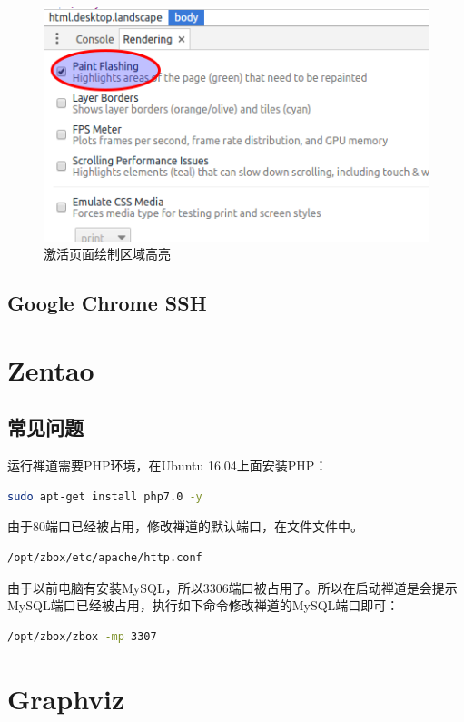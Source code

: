 \documentclass[letter]{book}
\begin{document}
\begin{figure}[htbp]
	\centering
	\includegraphics[scale=0.7]{pagepainting.png}
	\caption{激活页面绘制区域高亮}
	\label{fig:pagepainting}
\end{figure}


\subsection{Google Chrome SSH}

\section{Zentao}

\subsection{常见问题}

运行禅道需要PHP环境，在Ubuntu 16.04上面安装PHP：

\begin{lstlisting}[language=Bash]
sudo apt-get install php7.0 -y
\end{lstlisting}

由于80端口已经被占用，修改禅道的默认端口，在文件文件中。

\begin{lstlisting}
/opt/zbox/etc/apache/http.conf
\end{lstlisting}

由于以前电脑有安装MySQL，所以3306端口被占用了。所以在启动禅道是会提示MySQL端口已经被占用，执行如下命令修改禅道的MySQL端口即可：

\begin{lstlisting}[language=Bash]
/opt/zbox/zbox -mp 3307
\end{lstlisting}

\section{Graphviz}
\end{document}
